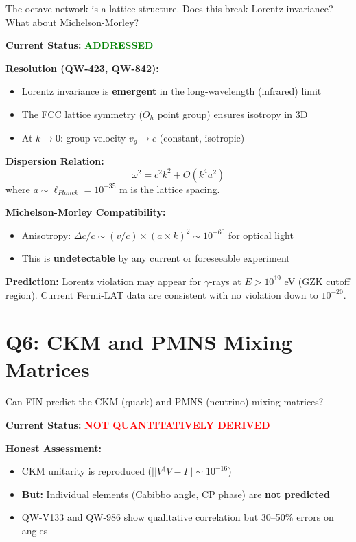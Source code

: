 \documentclass[11pt, a4paper]{article}
\theoremstyle{remark}
\begin{document}
\begin{question}[Relativity]
The octave network is a lattice structure. Does this break Lorentz invariance? What about Michelson-Morley?
\end{question}

\textbf{Current Status:} \textcolor{green}{\textbf{ADDRESSED}}

\textbf{Resolution (QW-423, QW-842):}
\begin{itemize}
    \item Lorentz invariance is \textbf{emergent} in the long-wavelength (infrared) limit
    \item The FCC lattice symmetry ($O_h$ point group) ensures isotropy in 3D
    \item At $k \to 0$: group velocity $v_g \to c$ (constant, isotropic)
\end{itemize}

\textbf{Dispersion Relation:}
\begin{equation}
\omega^2 = c^2 k^2 + O(k^4 a^2)
\end{equation}
where $a \sim \ell_{Planck} = 10^{-35}$ m is the lattice spacing.

\textbf{Michelson-Morley Compatibility:}
\begin{itemize}
    \item Anisotropy: $\Delta c / c \sim (v/c) \times (a \times k)^2 \sim 10^{-60}$ for optical light
    \item This is \textbf{undetectable} by any current or foreseeable experiment
\end{itemize}

\textbf{Prediction:}
Lorentz violation may appear for $\gamma$-rays at $E > 10^{19}$ eV (GZK cutoff region). Current Fermi-LAT data are consistent with no violation down to $10^{-20}$.

\hrulefill

\section{Q6: CKM and PMNS Mixing Matrices}

\begin{question}
Can FIN predict the CKM (quark) and PMNS (neutrino) mixing matrices?
\end{question}

\textbf{Current Status:} \textcolor{red}{\textbf{NOT QUANTITATIVELY DERIVED}}

\textbf{Honest Assessment:}
\begin{itemize}
    \item CKM unitarity is reproduced ($||V^\dagger V - I|| \sim 10^{-16}$)
    \item \textbf{But:} Individual elements (Cabibbo angle, CP phase) are \textbf{not predicted}
    \item QW-V133 and QW-986 show qualitative correlation but 30--50\% errors on angles
\end{itemize}
\end{document}
